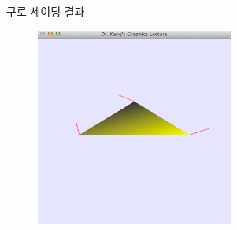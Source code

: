 \begin{frame}[fragile]{구로 세이딩 결과}

\begin{figure}[h!]
  \centering
    \includegraphics[height=6.5cm]{Math_lighting/normalSetting.png}
\end{figure}

\end{frame}


